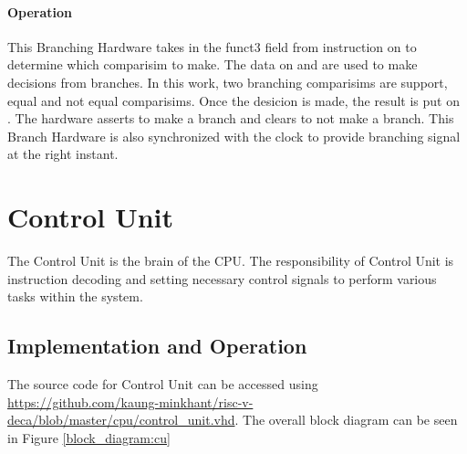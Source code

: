 \paragraph*{Operation}
This Branching Hardware takes in the funct3 field from instruction on  to determine which comparisim to make.
The data on  and  are used to make decisions from branches.
In this work, two branching comparisims are support, equal and not equal comparisims.
Once the desicion is made, the result is put on .
The hardware asserts  to make a branch and clears  to not make a branch.
This Branch Hardware is also synchronized with the clock to provide branching signal at the right instant.

\section{Control Unit}
The Control Unit is the brain of the CPU.
The responsibility of Control Unit is instruction decoding and setting necessary control signals to perform various tasks within the system.

\subsection{Implementation and Operation}
The source code for Control Unit
can be accessed using \url{https://github.com/kaung-minkhant/risc-v-deca/blob/master/cpu/control_unit.vhd}.
The overall block diagram can be seen in Figure \ref{block_diagram:cu}

\begin{table}[!h]
    \centering
    \caption{ Input/Output of Control Unit}
    \label{table:io_cu}
\end{table}


